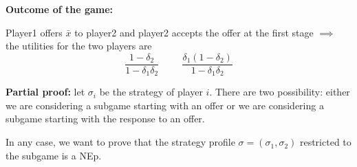 \bigskip
\noindent \textbf{Outcome of the game:}

\noindent Player1 offers $\bar{x}$ to player2 and player2 accepts the offer at the first stage $\implies$ the utilities for the two players are
\[
	\frac{1-\delta_2}{1-\delta_1\delta_2}
	\hspace{1cm}
	 \frac{\delta_1(1-\delta_2)}{1-\delta_1\delta_2}	
\]

\bigskip
\noindent \textbf{Partial proof:} let $\sigma_i$ be the strategy of player $i$. There are two possibility: either we are considering a subgame starting with an offer or we are considering a subgame starting with the response to an offer.

\noindent In any case, we want to prove that the strategy profile $\sigma = (\sigma_1,\sigma_2)$ restricted to the subgame is a NEp.

